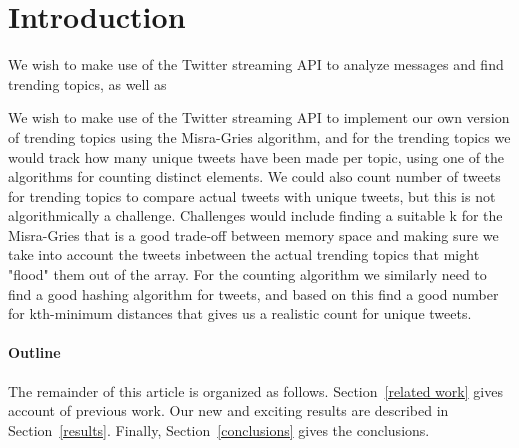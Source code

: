 \section{Introduction}
We wish to make use of the Twitter streaming API to analyze messages and find trending topics, as well as

We wish to make use of the Twitter streaming API to implement our own version of trending topics using the Misra-Gries algorithm, and for the trending topics we would track how many unique tweets have been made per topic, using one of the algorithms for counting distinct elements. We could also count number of tweets for trending topics to compare actual tweets with unique tweets, but this is not algorithmically a challenge.
\newline\newline
Challenges would include finding a suitable k for the Misra-Gries that is a good trade-off between memory space and making sure we take into account the tweets inbetween the actual trending topics that might "flood" them out of the array.
\newline\newline
For the counting algorithm we similarly need to find a good hashing algorithm for tweets, and based on this find a good number for kth-minimum distances that gives us a realistic count for unique tweets.

\paragraph{Outline}
The remainder of this article is organized as follows.
Section~\ref{related work} gives account of previous work.
Our new and exciting results are described in Section~\ref{results}.
Finally, Section~\ref{conclusions} gives the conclusions.
